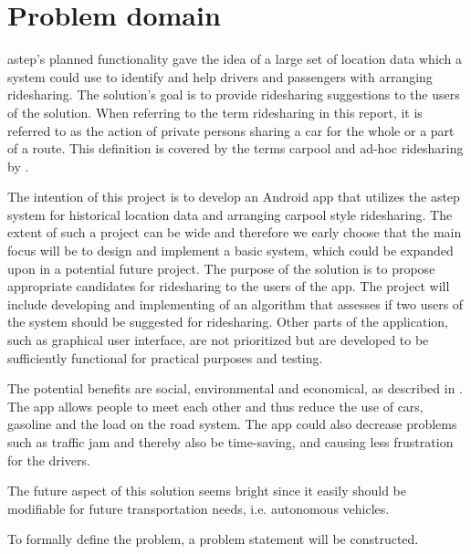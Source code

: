 \section{Problem domain}
\gls{astep}'s planned functionality gave the idea of a large set of location data which a system could use to identify and help drivers and passengers with arranging ridesharing.
The solution's goal is to provide ridesharing suggestions to the users of the solution.
When referring to the term ridesharing in this report, it is referred to as the action of private persons sharing a car for the whole or a part of a route. 
This definition is covered by the terms carpool and ad-hoc ridesharing by \citet{doi:10.1080/01441647.2011.621557}.  

The intention of this project is to develop an Android app that utilizes the \gls{astep} system for historical location data and arranging carpool style ridesharing.
The extent of such a project can be wide and therefore we early choose that the main focus will be to design and implement a basic system, which could be expanded upon in a potential future project.
The purpose of the solution is to propose appropriate candidates for ridesharing to the users of the app.
The project will include developing and implementing of an algorithm that assesses if two users of the system should be suggested for ridesharing.
Other parts of the application, such as graphical user interface, are not prioritized but are developed to be sufficiently functional for practical purposes and testing.

The potential benefits are social, environmental and economical, as described in \cite{doi:10.1080/01441647.2011.621557}.
The app allows people to meet each other and thus reduce the use of cars, gasoline and the load on the road system.
The app could also decrease problems such as traffic jam and thereby also be time-saving, and causing less frustration for the drivers.

The future aspect of this solution seems bright since it easily should be modifiable for future transportation needs, i.e. autonomous vehicles.

To formally define the problem, a problem statement will be constructed.